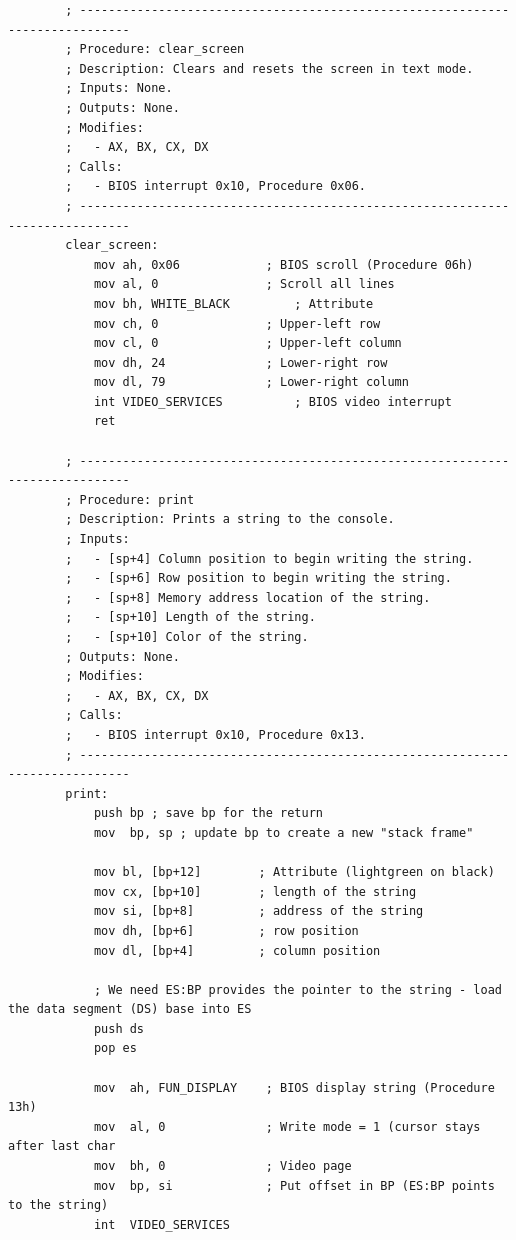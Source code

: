 \documentclass{article}
\begin{document}
\begin{lstlisting}
        ; -----------------------------------------------------------------------------
        ; Procedure: clear_screen
        ; Description: Clears and resets the screen in text mode.
        ; Inputs: None.
        ; Outputs: None.
        ; Modifies:
        ;   - AX, BX, CX, DX
        ; Calls:
        ;   - BIOS interrupt 0x10, Procedure 0x06.
        ; -----------------------------------------------------------------------------
        clear_screen:
            mov ah, 0x06            ; BIOS scroll (Procedure 06h)
            mov al, 0               ; Scroll all lines
            mov bh, WHITE_BLACK         ; Attribute
            mov ch, 0               ; Upper-left row
            mov cl, 0               ; Upper-left column
            mov dh, 24              ; Lower-right row
            mov dl, 79              ; Lower-right column
            int VIDEO_SERVICES          ; BIOS video interrupt
            ret

        ; -----------------------------------------------------------------------------
        ; Procedure: print
        ; Description: Prints a string to the console.
        ; Inputs:
        ;   - [sp+4] Column position to begin writing the string.
        ;   - [sp+6] Row position to begin writing the string.
        ;   - [sp+8] Memory address location of the string.
        ;   - [sp+10] Length of the string.
        ;   - [sp+10] Color of the string.
        ; Outputs: None.
        ; Modifies:
        ;   - AX, BX, CX, DX
        ; Calls:
        ;   - BIOS interrupt 0x10, Procedure 0x13.
        ; -----------------------------------------------------------------------------
        print:
            push bp ; save bp for the return
            mov  bp, sp ; update bp to create a new "stack frame"

            mov bl, [bp+12]        ; Attribute (lightgreen on black)
            mov cx, [bp+10]        ; length of the string
            mov si, [bp+8]         ; address of the string
            mov dh, [bp+6]         ; row position
            mov dl, [bp+4]         ; column position

            ; We need ES:BP provides the pointer to the string - load the data segment (DS) base into ES
            push ds
            pop es

            mov  ah, FUN_DISPLAY    ; BIOS display string (Procedure 13h)
            mov  al, 0              ; Write mode = 1 (cursor stays after last char
            mov  bh, 0              ; Video page
            mov  bp, si             ; Put offset in BP (ES:BP points to the string)
            int  VIDEO_SERVICES


\end{lstlisting}
\end{document}
